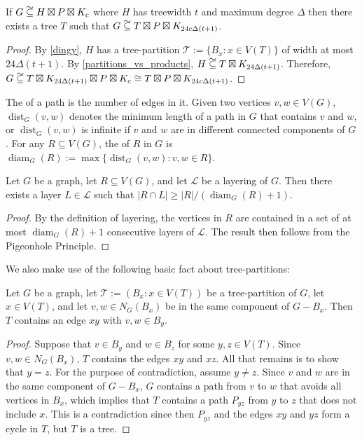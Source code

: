\documentclass{patmorin}
\DeclareMathOperator{\dist}{dist}
\DeclareMathOperator{\diam}{diam}
\newcommand\subsetcong{\mathrel{\text{%
    \setbox0\hbox{$\subseteq$}%
    \rlap{\hbox to \wd0{\hss\hss\hss\raisebox{1.5\height}{$\sim$}\hss}}\box0
}}}
\renewcommand{\ge}{\geqslant}
\begin{document}
\begin{cor}\label{ding_translation}
  If $G\subsetcong H\boxtimes P\boxtimes K_c$ where $H$ has treewidth $t$ and maximum degree $\Delta$ then there exists a tree $T$ such that $G\subsetcong T\boxtimes P\boxtimes K_{24c\Delta (t+1)}$.
\end{cor}

\begin{proof}
  By \cref{dingy}, $H$ has a tree-partition $\mathcal{T}:=\{B_x:x\in V(T)\}$ of width at most $24\Delta (t+1)$. By \cref{partitions_vs_products}, $H \subsetcong T\boxtimes K_{24\Delta (t+1)}$.  Therefore, $G\subsetcong T\boxtimes K_{24\Delta (t+1)}\boxtimes P\boxtimes K_c \cong T\boxtimes P\boxtimes K_{24c\Delta (t+1)}$.
\end{proof}

The  of a path is the number of edges in it. Given two vertices $v,w\in V(G)$, $\dist_G(v,w)$ denotes the minimum length of a path in $G$ that contains $v$ and $w$, or $\dist_G(v,w)$ is infinite if $v$ and $w$ are in different connected components of $G$. For any $R\subseteq V(G)$, the  of $R$ in $G$ is $\diam_G(R):=\max\{\dist_G(v,w):v,w\in R\}$.

\begin{obs}\label{diameter_spread}
  Let $G$ be a graph, let $R\subseteq V(G)$, and let $\mathcal{L}$ be a layering of $G$.  Then there exists a layer $L\in\mathcal{L}$ such that $|R\cap L|\ge |R|/(\diam_G(R)+1)$.
\end{obs}

\begin{proof}
  By the definition of layering, the vertices in $R$ are contained in a set of at most $\diam_G(R)+1$ consecutive layers of $\mathcal{L}$. The result then follows from the Pigeonhole Principle.
\end{proof}


We also make use of the following basic fact about tree-partitions:

\begin{obs}\label{tree_thingy}
  Let $G$ be a graph, let $\mathcal{T}:=(B_x:x\in V(T))$ be a tree-partition of $G$, let $x\in V(T)$, and let $v,w\in N_G(B_x)$ be in the same component of $G-B_x$.  Then $T$ contains an edge $xy$ with $v,w\in B_y$.
\end{obs}

\begin{proof}
  Suppose that $v\in B_y$ and $w\in B_z$ for some $y,z\in V(T)$.  Since $v,w\in N_G(B_x)$, $T$ contains the edges $xy$ and $xz$.  All that remains is to show that $y=z$. For the purpose of contradiction, assume $y\neq z$.  Since $v$ and $w$ are in the same component of $G-B_x$, $G$ contains a path from $v$ to $w$ that avoids all vertices in $B_x$, which implies that $T$ contains a path $P_{yz}$ from $y$ to $z$ that does not include $x$.  This is a contradiction since then $P_{yz}$ and the edges $xy$ and $yz$ form a cycle in $T$, but $T$ is a tree.
\end{proof}
\end{document}
